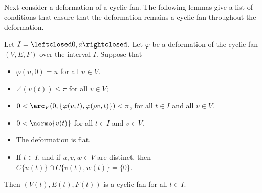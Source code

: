 Next  consider a deformation of a cyclic fan.  The following lemmas give a list of conditions that ensure that the deformation remains a cyclic fan throughout the deformation.


\begin{lemma} 
Let $I = \leftclosed 0,a\rightclosed$.  Let $\varphi$ be a deformation of the cyclic fan $(V,E,F)$ over
the interval $I$.    Suppose that 
\begin{itemize}
\item $\varphi(u,0)=u$ for all $u\in V$. 
\item $\angle(v(t))\le \pi$ for all $v\in V$;
\item $0 < \arc_V(0,\{\varphi(v,t),\varphi(\rho v,t)\}) < \pi$, for all $t\in I$ and all $v\in V$.
\item $0 < \normo{v(t)}$ for all $t\in I$ and $v\in V$.
\item The deformation is flat.
\item If $t\in I$, and if $u,v,w\in V$ are distinct, 
then $C\{u(t)\}\cap C\{v(t),w(t)\} = \{0\}$.
\end{itemize}
Then $(V(t),E(t),F(t))$ is a cyclic fan for all $t\in I$.
\end{lemma}
%
%

